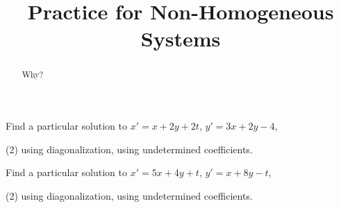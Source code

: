\documentclass{ximera}
\title{Practice for Non-Homogeneous Systems}
\begin{document}
\begin{abstract}
    Why?
\end{abstract}
\maketitle



\begin{exercise}
    Find a particular solution to $x' = x+ 2y +2t$,  $y' = 3x + 2y -4$,
    \begin{tasks}(2)
        \task using diagonalization,
        \task using undetermined coefficients.
    \end{tasks}
\end{exercise}

\begin{exercise}%
    Find a particular solution to $x' = 5x + 4y + t$, $y' = x + 8y - t$,
    \begin{tasks}(2)
        \task using diagonalization,
        \task using undetermined coefficients.
    \end{tasks}
\end{exercise}
\end{document}
